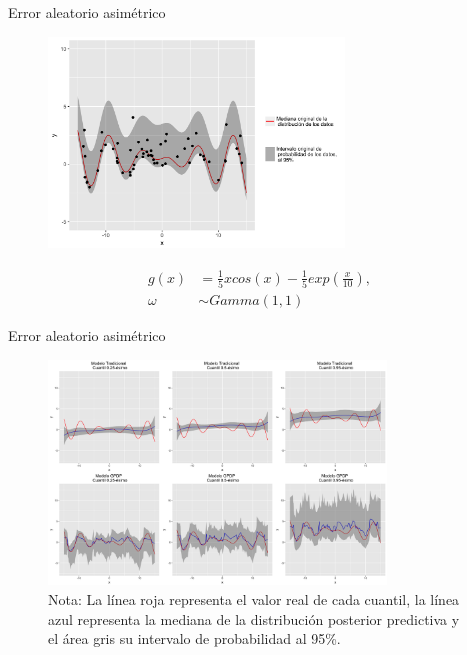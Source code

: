\documentclass{beamer}
\begin{document}
\begin{frame}{Error aleatorio asim\'etrico}
    \begin{figure}[H]
        	\centering
        	\includegraphics[width=0.7\textwidth]{Figures/Simulation/asymmetric/sample.png}
        	\label{sample_classic}
    \end{figure}
    \begin{equation*}
    \begin{aligned}
        g(x) &= \frac{1}{5} x cos(x) - \frac{1}{5}exp\left(\frac{x}{10}\right),\\
        \omega &\sim Gamma(1,1)
    \end{aligned}
    \end{equation*}
\end{frame}

\begin{frame}{Error aleatorio asim\'etrico}
    \begin{figure}[H]
        \centering
        \includegraphics[width=0.8\textwidth]{Figures/Simulation/asymmetric/presentation.png}
        \captionsetup{singlelinecheck=off,font=footnotesize}
        \caption*{Nota: La l\'inea roja representa el valor real de cada cuantil, la l\'inea azul representa la mediana de la distribuci\'on posterior predictiva y el \'area gris su intervalo de probabilidad al 95\%.}
    \end{figure}
\end{frame}
\end{document}
